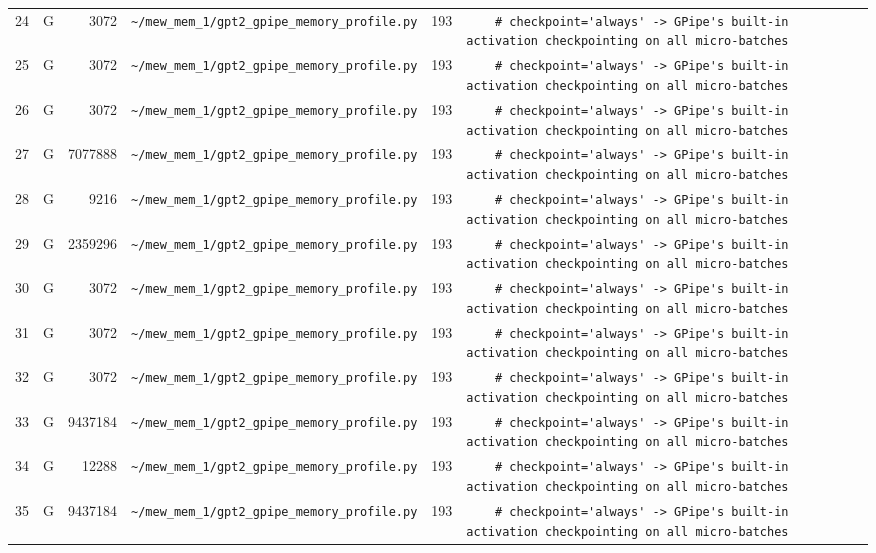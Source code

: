 \documentclass{article}
\begin{document}
\begin{longtable}{r l r p{6.5cm} r p{7.0cm}}
24 & G & 3072 & \lstinline|~/mew_mem_1/gpt2_gpipe_memory_profile.py| & 193 & \lstinline|    # checkpoint='always' -> GPipe's built-in activation checkpointing on all micro-batches| \\
25 & G & 3072 & \lstinline|~/mew_mem_1/gpt2_gpipe_memory_profile.py| & 193 & \lstinline|    # checkpoint='always' -> GPipe's built-in activation checkpointing on all micro-batches| \\
26 & G & 3072 & \lstinline|~/mew_mem_1/gpt2_gpipe_memory_profile.py| & 193 & \lstinline|    # checkpoint='always' -> GPipe's built-in activation checkpointing on all micro-batches| \\
27 & G & 7077888 & \lstinline|~/mew_mem_1/gpt2_gpipe_memory_profile.py| & 193 & \lstinline|    # checkpoint='always' -> GPipe's built-in activation checkpointing on all micro-batches| \\
28 & G & 9216 & \lstinline|~/mew_mem_1/gpt2_gpipe_memory_profile.py| & 193 & \lstinline|    # checkpoint='always' -> GPipe's built-in activation checkpointing on all micro-batches| \\
29 & G & 2359296 & \lstinline|~/mew_mem_1/gpt2_gpipe_memory_profile.py| & 193 & \lstinline|    # checkpoint='always' -> GPipe's built-in activation checkpointing on all micro-batches| \\
30 & G & 3072 & \lstinline|~/mew_mem_1/gpt2_gpipe_memory_profile.py| & 193 & \lstinline|    # checkpoint='always' -> GPipe's built-in activation checkpointing on all micro-batches| \\
31 & G & 3072 & \lstinline|~/mew_mem_1/gpt2_gpipe_memory_profile.py| & 193 & \lstinline|    # checkpoint='always' -> GPipe's built-in activation checkpointing on all micro-batches| \\
32 & G & 3072 & \lstinline|~/mew_mem_1/gpt2_gpipe_memory_profile.py| & 193 & \lstinline|    # checkpoint='always' -> GPipe's built-in activation checkpointing on all micro-batches| \\
33 & G & 9437184 & \lstinline|~/mew_mem_1/gpt2_gpipe_memory_profile.py| & 193 & \lstinline|    # checkpoint='always' -> GPipe's built-in activation checkpointing on all micro-batches| \\
34 & G & 12288 & \lstinline|~/mew_mem_1/gpt2_gpipe_memory_profile.py| & 193 & \lstinline|    # checkpoint='always' -> GPipe's built-in activation checkpointing on all micro-batches| \\
35 & G & 9437184 & \lstinline|~/mew_mem_1/gpt2_gpipe_memory_profile.py| & 193 & \lstinline|    # checkpoint='always' -> GPipe's built-in activation checkpointing on all micro-batches| \\

\end{longtable}
\end{document}
